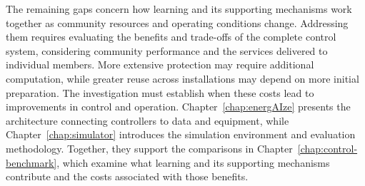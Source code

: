 The remaining gaps concern how learning and its supporting mechanisms work together as community resources and operating conditions change. Addressing them requires evaluating the benefits and trade-offs of the complete control system, considering community performance and the services delivered to individual members. More extensive protection may require additional computation, while greater reuse across installations may depend on more initial preparation. The investigation must establish when these costs lead to improvements in control and operation. Chapter~\ref{chap:energAIze} presents the architecture connecting controllers to data and equipment, while Chapter~\ref{chap:simulator} introduces the simulation environment and evaluation methodology. Together, they support the comparisons in Chapter~\ref{chap:control-benchmark}, which examine what learning and its supporting mechanisms contribute and the costs associated with those benefits.

\endgroup
